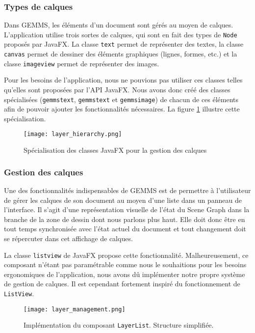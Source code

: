 \subsubsection{Types de calques}
Dans GEMMS, les éléments d'un document sont gérés au moyen de calques. L'application utilise trois sortes de calques, qui sont en fait des types de \texttt{Node} proposés par JavaFX. La classe \texttt{\gls{text}} permet de représenter des textes, la classe \texttt{\gls{canvas}} permet de dessiner des éléments graphiques (lignes, formes, etc.) et la classe \texttt{\gls{imageview}} permet de représenter des images. 

Pour les besoins de l'application, nous ne pouvions pas utiliser ces classes telles qu'elles sont proposées par l'API JavaFX. Nous avons donc créé des classes spécialisées (\texttt{\gls{gemmstext}}, \texttt{\gls{gemmstext}} et  \texttt{\gls{gemmsimage}}) de chacun de ces éléments afin de pouvoir ajouter les fonctionnalités nécessaires. La figure \ref{fig:layer_hierarchy} illustre cette spécialisation.

\begin{figure}[!ht]
	\caption{Spécialisation des classes JavaFX pour la gestion des calques}
	\centering
	\texttt{[image: layer\_hierarchy.png]}
	\label{fig:layer_hierarchy}
\end{figure}


\subsubsection{Gestion des calques}

Une des fonctionnalités indispensables de GEMMS est de permettre à l'utilisateur de gérer les calques de son document au moyen d'une liste dans un panneau de l'interface. Il s'agit d'une représentation visuelle de l'état du Scene Graph dans la branche de la zone de dessin dont nous parlons plus haut. Elle doit donc être en tout temps synchronisée avec l'état actuel du document et tout changement doit se répercuter dans cet affichage de calques.

La classe \texttt{\gls{listview}} de JavaFX propose cette fonctionnalité. Malheureusement, ce composant n'étant pas paramétrable comme nous le souhaitions pour les besoins ergonomiques de l'application, nous avons dû implémenter notre propre système de gestion de calques. Il est cependant fortement inspiré du fonctionnement de \texttt{ListView}.

\begin{figure}[!ht]
	\caption{Implémentation du composant \texttt{LayerList}. Structure simplifiée.}
	\centering
	\texttt{[image: layer\_management.png]}
	\label{fig:layer_management}
\end{figure}

